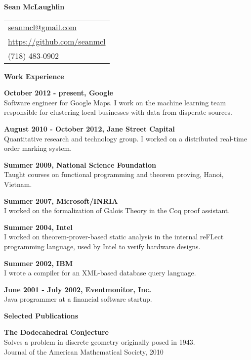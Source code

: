 \documentclass[a4paper,12pt,final]{memoir}
\newcommand{\SmallSep}{\vspace{0.5em}}
\newcommand{\CVSection}[1]
{\Large\textbf{#1}\par
  \SmallSep\normalsize\normalfont}
\newcommand{\CVItem}[1]
{\textbf{\color{RoyalBlue} #1}}
\begin{document}

\Huge\bfseries {\color{RoyalBlue} Sean McLaughlin}
\normalsize\normalfont

\begin{flushright}\small
  \vspace{-3em}
  \begin{tabular}{l}
    \url{seanmcl@gmail.com}\\
    \url{https://github.com/seanmcl}\\
    (718) 483-0902
  \end{tabular}
\end{flushright}\normalsize

\normalsize\normalfont

\vspace{-1em}

\CVSection{Work Experience}
\CVItem{October 2012 - present, Google}\\
Software engineer for Google Maps.  I work on the machine learning
team responsible for clustering local businesses with data
from disperate sources.
\SmallSep

\CVItem{August 2010 - October 2012, Jane Street Capital}\\
Quantitative research and technology group.  I worked on a
distributed real-time order marking system.
\SmallSep

\CVItem{Summer 2009, National Science Foundation} \\
Taught courses on functional programming and theorem proving, Hanoi, Vietnam.
\SmallSep

\CVItem{Summer 2007, Microsoft/INRIA} \\
I worked on the formalization of Galois Theory in the Coq proof
assistant.
\SmallSep

\CVItem{Summer 2004, Intel} \\
I worked on theorem-prover-based static analysis in the internal
reFLect programming language, used by Intel to verify hardware
designs.
\SmallSep

\CVItem{Summer 2002, IBM} \\
I wrote a compiler for an XML-based database query language.
\SmallSep

\CVItem{June 2001 - July 2002, Eventmonitor, Inc.} \\
Java programmer at a financial software startup.
\SmallSep

\CVSection{Selected Publications}

\CVItem{The Dodecahedral Conjecture} \\
Solves a problem in discrete geometry originally posed in 1943.\\
Journal of the American Mathematical Society, 2010
\SmallSep
\end{document}
